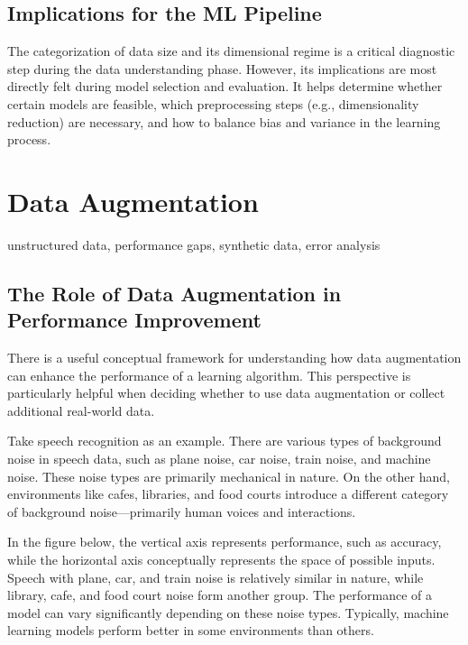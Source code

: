 \documentclass[12pt,openany]{book}
\begin{document}
\subsection{Implications for the ML Pipeline}

The categorization of data size and its dimensional regime is a critical diagnostic step during the data understanding phase. However, its implications are most directly felt during model selection and evaluation. It helps determine whether certain models are feasible, which preprocessing steps (e.g., dimensionality reduction) are necessary, and how to balance bias and variance in the learning process.



\section{Data Augmentation}

\begin{keywordsbox}
unstructured data, performance gaps, synthetic data, error analysis
\end{keywordsbox}

\subsection{The Role of Data Augmentation in Performance Improvement}

There is a useful conceptual framework for understanding how data augmentation can enhance the performance of a learning algorithm. This perspective is particularly helpful when deciding whether to use data augmentation or collect additional real-world data. 
\newline

Take speech recognition as an example. There are various types of background noise in speech data, such as plane noise, car noise, train noise, and machine noise. These noise types are primarily mechanical in nature. On the other hand, environments like cafes, libraries, and food courts introduce a different category of background noise—primarily human voices and interactions. 
\newline

In the figure below, the vertical axis represents performance, such as accuracy, while the horizontal axis conceptually represents the space of possible inputs. Speech with plane, car, and train noise is relatively similar in nature, while library, cafe, and food court noise form another group. The performance of a model can vary significantly depending on these noise types. Typically, machine learning models perform better in some environments than others. 
\newline
\end{document}
